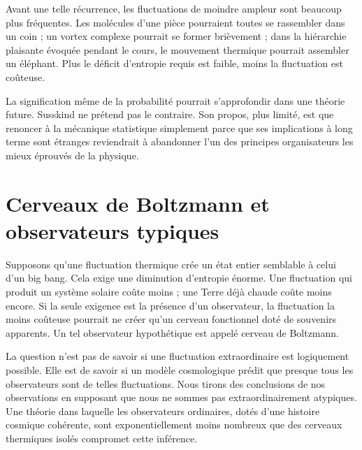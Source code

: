 Avant une telle récurrence, les fluctuations de moindre ampleur sont beaucoup plus fréquentes. Les molécules d’une pièce pourraient toutes se rassembler dans un coin ; un vortex complexe pourrait se former brièvement ; dans la hiérarchie plaisante évoquée pendant le cours, le mouvement thermique pourrait assembler un éléphant. Plus le déficit d’entropie requis est faible, moins la fluctuation est coûteuse.

\begin{classroomqa}
\end{classroomqa}

La signification même de la probabilité pourrait s’approfondir dans une théorie future. Susskind ne prétend pas le contraire. Son propos, plus limité, est que renoncer à la mécanique statistique simplement parce que ses implications à long terme sont étranges reviendrait à abandonner l’un des principes organisateurs les mieux éprouvés de la physique.

\section{Cerveaux de Boltzmann et observateurs typiques}

Supposons qu’une fluctuation thermique crée un état entier semblable à celui d’un big bang. Cela exige une diminution d’entropie énorme. Une fluctuation qui produit un système solaire coûte moins ; une Terre déjà chaude coûte moins encore. Si la seule exigence est la présence d’un observateur, la fluctuation la moins coûteuse pourrait ne créer qu’un cerveau fonctionnel doté de souvenirs apparents. Un tel observateur hypothétique est appelé cerveau de Boltzmann.

La question n’est pas de savoir si une fluctuation extraordinaire est logiquement possible. Elle est de savoir si un modèle cosmologique prédit que presque tous les observateurs sont de telles fluctuations. Nous tirons des conclusions de nos observations en supposant que nous ne sommes pas extraordinairement atypiques. Une théorie dans laquelle les observateurs ordinaires, dotés d’une histoire cosmique cohérente, sont exponentiellement moins nombreux que des cerveaux thermiques isolés compromet cette inférence.

